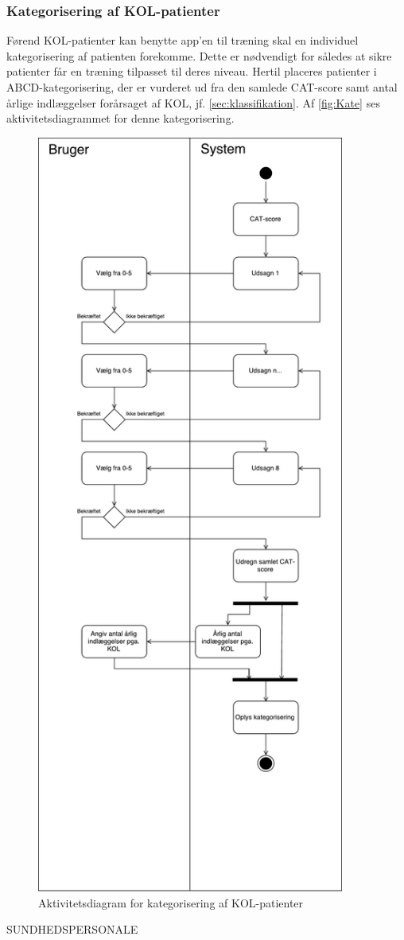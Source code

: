 \subsubsection{Kategorisering af KOL-patienter}
Førend KOL-patienter kan benytte app'en til træning skal en individuel kategorisering af patienten forekomme. Dette er nødvendigt for således at sikre patienter får en træning tilpasset til deres niveau. 
Hertil placeres patienter i ABCD-kategorisering, der er vurderet ud fra den samlede CAT-score samt antal årlige indlæggelser forårsaget af KOL, jf. \autoref{sec:klassifikation}. Af \autoref{fig:Kate} ses aktivitetsdiagrammet for denne kategorisering.

\begin{figure} [H]
\centering
\includegraphics[width=0.9\textwidth]{figures/aktivitetsdiagram/Kategorisering}
\caption{Aktivitetsdiagram for kategorisering af KOL-patienter}
\label{fig:Kate}
\end{figure}







SUNDHEDSPERSONALE